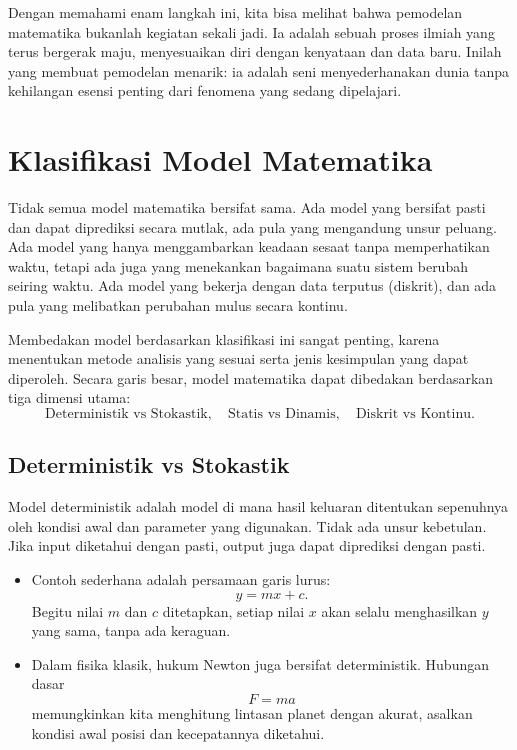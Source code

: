 \documentclass{bukumjh}
\begin{document}
Dengan memahami enam langkah ini, kita bisa melihat bahwa pemodelan matematika bukanlah kegiatan sekali jadi. Ia adalah sebuah proses ilmiah yang terus bergerak maju, menyesuaikan diri dengan kenyataan dan data baru. Inilah yang membuat pemodelan menarik: ia adalah seni menyederhanakan dunia tanpa kehilangan esensi penting dari fenomena yang sedang dipelajari.

\section{Klasifikasi Model Matematika}

Tidak semua model matematika bersifat sama. Ada model yang bersifat pasti dan dapat diprediksi secara mutlak, ada pula yang mengandung unsur peluang. Ada model yang hanya menggambarkan keadaan sesaat tanpa memperhatikan waktu, tetapi ada juga yang menekankan bagaimana suatu sistem berubah seiring waktu. Ada model yang bekerja dengan data terputus (diskrit), dan ada pula yang melibatkan perubahan mulus secara kontinu.  

Membedakan model berdasarkan klasifikasi ini sangat penting, karena menentukan metode analisis yang sesuai serta jenis kesimpulan yang dapat diperoleh. Secara garis besar, model matematika dapat dibedakan berdasarkan tiga dimensi utama: 
\[
\text{Deterministik vs Stokastik}, \quad
\text{Statis vs Dinamis}, \quad
\text{Diskrit vs Kontinu}.
\]

\subsection{Deterministik vs Stokastik}

{\jsg Model deterministik} adalah model di mana hasil keluaran ditentukan sepenuhnya oleh kondisi awal dan parameter yang digunakan. Tidak ada unsur kebetulan. Jika input diketahui dengan pasti, output juga dapat diprediksi dengan pasti.  

\begin{itemize}
    \item Contoh sederhana adalah persamaan garis lurus:
    \[
    y = mx + c.
    \]
    Begitu nilai $m$ dan $c$ ditetapkan, setiap nilai $x$ akan selalu menghasilkan $y$ yang sama, tanpa ada keraguan.
    
    \item Dalam fisika klasik, hukum Newton juga bersifat deterministik. Hubungan dasar
    \[
    F = ma
    \]
    memungkinkan kita menghitung lintasan planet dengan akurat, asalkan kondisi awal posisi dan kecepatannya diketahui.
\end{itemize}
\end{document}
